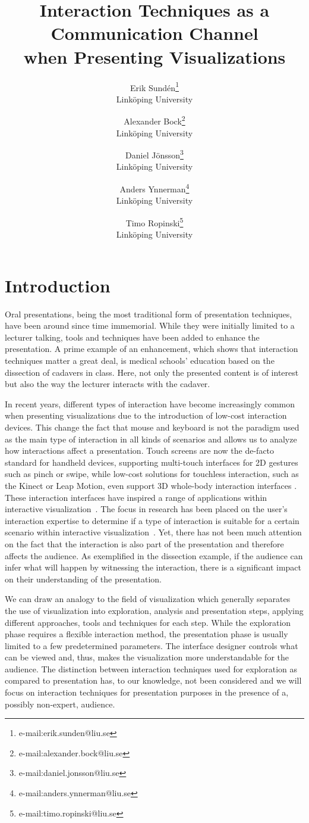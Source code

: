 \documentclass[review,journal]{vgtc}         %
\title{Interaction Techniques as a Communication Channel\\when Presenting Visualizations} %
\author{Erik Sund\'en\thanks{e-mail:erik.sunden@liu.se}\\ %
        \scriptsize Link{\"o}ping University %
\and Alexander Bock\thanks{e-mail:alexander.bock@liu.se}\\ %
			   \scriptsize Link{\"o}ping University %
\and Daniel J\"onsson\thanks{e-mail:daniel.jonsson@liu.se}\\ %
          \scriptsize Link{\"o}ping University %
\and Anders Ynnerman\thanks{e-mail:anders.ynnerman@liu.se}\\ %
          \scriptsize Link{\"o}ping University %
\and Timo Ropinski\thanks{e-mail:timo.ropinski@liu.se}\\ %
           \scriptsize Link{\"o}ping University }
\begin{document}
\maketitle

\section{Introduction}\label{sec:introduction}
Oral presentations, being the most traditional form of presentation techniques, have been around since time immemorial.
While they were initially limited to a lecturer talking, tools and techniques have been added to enhance the presentation.
A prime example of an enhancement, which shows that interaction techniques matter a great deal, is medical schools' education based on the dissection of cadavers in class.
Here, not only the presented content is of interest but also the way the lecturer interacts with the cadaver.

In recent years, different types of interaction have become increasingly common when presenting visualizations due to the introduction of low-cost interaction devices.
This change the fact that mouse and keyboard is not the paradigm used as the main type of interaction in all kinds of scenarios and allows us to analyze how interactions affect a presentation.
Touch screens are now the de-facto standard for handheld devices, supporting multi-touch interfaces for 2D gestures such as pinch or swipe, while low-cost solutions for touchless interaction, such as the Kinect or Leap Motion, even support 3D whole-body interaction interfaces \cite{978-0-85729-432-6, Shoemaker:2010:BIT:1868914.1868967}. 
These interaction interfaces have inspired a range of applications within interactive visualization~\cite{zora82163, Jalaliniya:2013:TIM:2494091.2497332, OHaraGSPVMCCRDC14, 0724-4983}.
The focus in research has been placed on the user's interaction expertise to determine if a type of interaction is suitable for a certain scenario within interactive visualization~\cite{5693835, so64840, DBLP:journals/tvcg/YiKSJ07}.
Yet, there has not been much attention on the fact that the interaction is also part of the presentation and therefore affects the audience.
As exemplified in the dissection example, if the audience can infer what will happen by witnessing the interaction, there is a significant impact on their understanding of the presentation.

We can draw an analogy to the field of visualization which generally separates the use of visualization into exploration, analysis and presentation steps, applying different approaches, tools and techniques for each step.
While the exploration phase requires a flexible interaction method, the presentation phase is usually limited to a few predetermined parameters.
The interface designer controls what can be viewed and, thus, makes the visualization more understandable for the audience.
The distinction between interaction techniques used for exploration as compared to presentation has, to our knowledge, not been considered and we will focus on interaction techniques for presentation purposes in the presence of a, possibly non-expert, audience.
\end{document}
